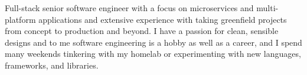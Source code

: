 

\begin{cvparagraph}





Full-stack senior software engineer with a focus on microservices and multi-platform applications and extensive experience with taking greenfield projects from concept to production and beyond. I have a passion for clean, sensible designs and to me software engineering is a hobby as well as a career, and I spend many weekends tinkering with my homelab or experimenting with new languages, frameworks, and libraries.



\end{cvparagraph}
